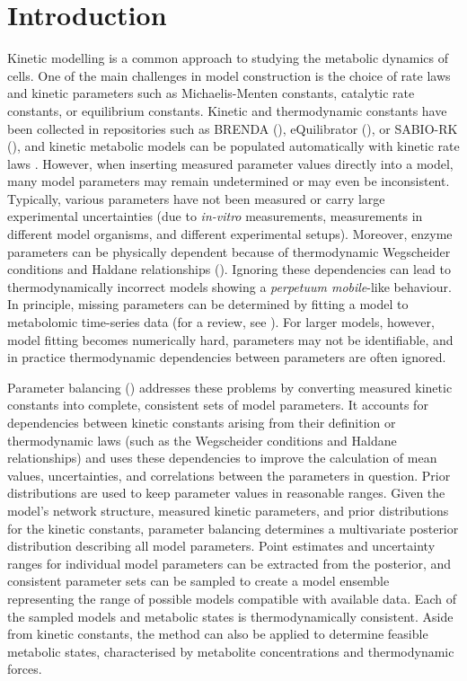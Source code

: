 \documentclass{bioinfo}
\begin{document}
\section{Introduction}

Kinetic modelling is a common approach to studying the metabolic
dynamics of cells. One of the main challenges in model construction is
the choice of rate laws and kinetic parameters such as
Michaelis-Menten constants, catalytic rate constants, or equilibrium
constants. Kinetic and thermodynamic constants have been collected in
repositories such as BRENDA (\cite{scheer2010brenda}), eQuilibrator
(\cite{flamholz2011equilibrator}), or SABIO-RK
(\cite{wittig2011sabio}), and kinetic metabolic models can be
populated automatically with kinetic rate laws
\cite{likl:06a,dhss:08}.  However, when inserting measured parameter
values directly into a model, many model parameters may remain
undetermined or may even be inconsistent. Typically, various
parameters have not been measured or carry large experimental
uncertainties (due to \emph{in-vitro} measurements, measurements in
different model organisms, and different experimental
setups). Moreover, enzyme parameters can be physically dependent
because of thermodynamic Wegscheider conditions and Haldane
relationships (\cite{haldane1930enzymes}). Ignoring these dependencies
can lead to thermodynamically incorrect models showing a
\emph{perpetuum mobile}-like behaviour. In principle, missing
parameters can be determined by fitting a model to metabolomic
time-series data (for a review, see
\cite{ashyraliyev2009systems}). For larger models, however, model
fitting becomes numerically hard, parameters may not be identifiable,
and in practice thermodynamic dependencies between parameters are
often ignored.

Parameter balancing (\cite{lubitz2010parameter}) addresses these
problems by converting measured kinetic constants into complete,
consistent sets of model parameters. It accounts for dependencies
between kinetic constants arising from their definition or
thermodynamic laws (such as the Wegscheider conditions and Haldane
relationships) and uses these dependencies to improve the calculation
of mean values, uncertainties, and correlations between the parameters
in question. Prior distributions are used to keep parameter values in
reasonable ranges. Given the model’s network structure, measured
kinetic parameters, and prior distributions for the kinetic constants,
parameter balancing determines a multivariate posterior distribution
describing all model parameters. Point estimates and uncertainty
ranges for individual model parameters can be extracted from the
posterior, and consistent parameter sets can be sampled to create a
model ensemble representing the range of possible models compatible
with available data. Each of the sampled models and metabolic states
is thermodynamically consistent. Aside from kinetic constants, the
method can also be applied to determine feasible metabolic states,
characterised by metabolite concentrations and thermodynamic forces.
\end{document}
